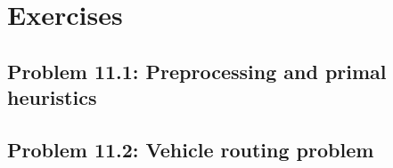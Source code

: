 \pagebreak

\section{Exercises}


\subsection*{Problem 11.1: Preprocessing and primal heuristics}


\subsection*{Problem 11.2: Vehicle routing problem}






